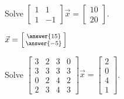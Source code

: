 \documentclass{ximera}
\begin{document}
\begin{exercise}%
    Solve
    $\left[ 
        \begin{smallmatrix}
            1 & 1 \\
            1 & -1
        \end{smallmatrix}
    \right] 
    \vec{x} = 
    \left[ 
        \begin{smallmatrix}
            10 \\ 
            20
        \end{smallmatrix}
    \right]$.
    \begin{multipleChoice}
    \end{multipleChoice}
    \begin{problem}
        $\vec{x} = \left[ \begin{smallmatrix} \answer{15} \\ \answer{-5} \end{smallmatrix}\right]$
    \end{problem}
\end{exercise}


\begin{exercise}
    Solve
    $\left[ 
        \begin{smallmatrix}
            3 & 2 & 3 & 0 \\
            3 & 3 & 3 & 3 \\
            0 & 2 & 4 & 2 \\
            2 & 3 & 4 & 3 
        \end{smallmatrix} 
    \right] 
    \vec{x} =
    \left[ 
        \begin{smallmatrix}
            2 \\
            0 \\
            4 \\
            1
        \end{smallmatrix} 
    \right]$.
    \begin{multipleChoice}
    \end{multipleChoice}
\end{exercise}
\end{document}
